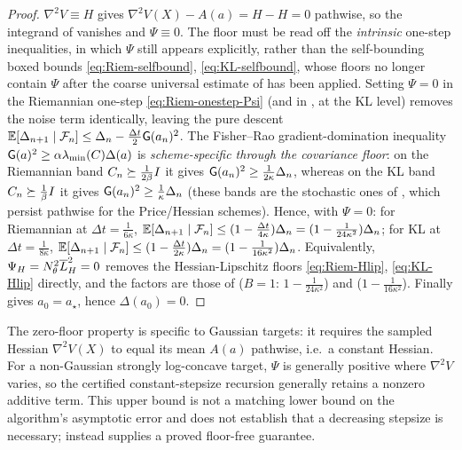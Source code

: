 \begin{proof}
$\nabla^2V\equiv H$ gives $\nabla^2V(X)-A(a)=H-H=0$ pathwise, so the integrand of 
vanishes and $\Psi\equiv0$. The floor must be read off the \emph{intrinsic} one-step inequalities,
in which $\Psi$ still appears explicitly, rather than the self-bounding boxed bounds
\eqref{eq:Riem-selfbound}, \eqref{eq:KL-selfbound}, whose floors no longer contain $\Psi$ after the
coarse universal estimate of  has been applied. Setting $\Psi=0$ in the
Riemannian one-step \eqref{eq:Riem-onestep-Psi} (and in , at the KL level)
removes the noise term identically, leaving the pure descent
$\mathbb{E}[\Delta_{n+1}\mid\mathcal{F}_n]\leq\Delta_n-\tfrac{\Delta t}2\mathsf{G}(a_n)^2$. The Fisher--Rao
gradient-domination inequality $\mathsf{G}(a)^2\geq\alpha\lambda_{\min}(C)\Delta(a)$ is
\emph{scheme-specific through the covariance floor}: on the Riemannian band $C_n\succeq\tfrac1{2\beta}I$
it gives $\mathsf{G}(a_n)^2\geq\tfrac1{2\kappa}\Delta_n$, whereas on the KL band $C_n\succeq\tfrac1\beta I$
it gives $\mathsf{G}(a_n)^2\geq\tfrac1\kappa\Delta_n$ (these bands are the stochastic ones of
, which persist pathwise for the Price/Hessian schemes). Hence, with $\Psi=0$:
for Riemannian at $\Delta t=\tfrac1{6\kappa}$,
$\mathbb{E}[\Delta_{n+1}\mid\mathcal{F}_n]\leq(1-\tfrac{\Delta t}{4\kappa})\Delta_n=(1-\tfrac1{24\kappa^2})\Delta_n$; for
KL at $\Delta t=\tfrac1{8\kappa}$,
$\mathbb{E}[\Delta_{n+1}\mid\mathcal{F}_n]\leq(1-\tfrac{\Delta t}{2\kappa})\Delta_n=(1-\tfrac1{16\kappa^2})\Delta_n$.
Equivalently, $\Psi_H=N_\theta^2\overline{L}_H^2=0$ removes the Hessian-Lipschitz
floors \eqref{eq:Riem-Hlip}, \eqref{eq:KL-Hlip} directly, and the factors are those of
 ($B=1$: $1-\tfrac1{24\kappa^2}$) and  ($1-\tfrac1{16\kappa^2}$).
Finally  gives $a_0=a_\star$, hence $\Delta(a_0)=0$.
\end{proof}

\begin{remark}
\label{rem:gauss-nofloor-scope}
The zero-floor property is specific to Gaussian targets: it requires the sampled Hessian
$\nabla^2V(X)$ to equal its mean $A(a)$ pathwise, i.e.\ a constant Hessian. For a non-Gaussian
strongly log-concave target, $\Psi$ is generally positive where $\nabla^2V$ varies, so the certified
constant-stepsize recursion generally retains a nonzero additive term. This upper bound is not a
matching lower bound on the algorithm's asymptotic error and does not establish that a decreasing
stepsize is necessary;  instead supplies a proved floor-free guarantee.
\end{remark}

